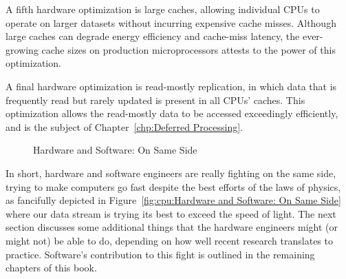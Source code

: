 A fifth hardware optimization is large caches, allowing individual
CPUs to operate on larger datasets without incurring expensive cache
misses.
Although large caches can degrade energy efficiency and cache-miss
latency, the ever-growing cache sizes on production microprocessors
attests to the power of this optimization.

A final hardware optimization is read-mostly replication, in which
data that is frequently read but rarely updated is present in all
CPUs' caches.
This optimization allows the read-mostly data to be accessed
exceedingly efficiently, and is the subject of
Chapter~\ref{chp:Deferred Processing}.

\begin{figure}[tb]
\centering
{}
\caption{Hardware and Software: On Same Side}
\end{figure}

In short, hardware and software engineers are really fighting on the same
side, trying to make computers go fast despite the best efforts of the
laws of physics, as fancifully depicted in
Figure~\ref{fig:cpu:Hardware and Software: On Same Side}
where our data stream is trying its best to exceed the speed of light.
The next section discusses some additional things that the hardware engineers
might (or might not) be able to do, depending on how well recent
research translates to practice.
Software's contribution to this fight is outlined in the remaining chapters
of this book.

